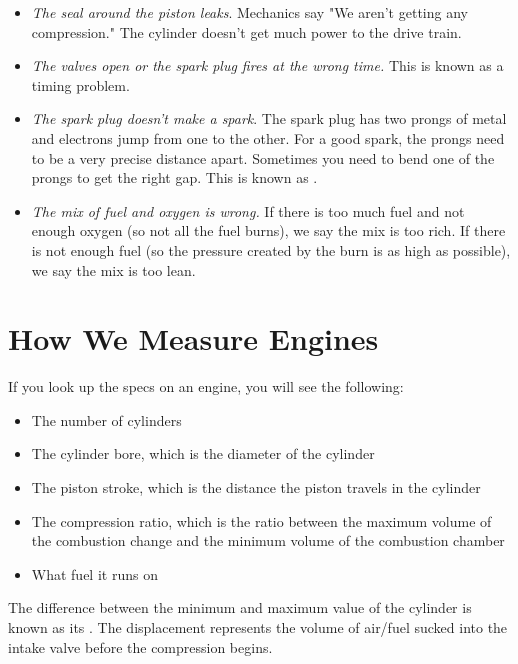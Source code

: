 \begin{itemize}

\item \textit{The seal around the piston leaks}.  Mechanics say "We aren't getting any compression."  The cylinder doesn't get much power to the drive train.

\item \textit{The valves open or the spark plug fires at the wrong time.}  This is known as a timing problem. 

\item \textit{The spark plug doesn't make a spark}. The spark plug has two prongs of metal and electrons jump from one to the other.  For a good spark,  the prongs need to be a very precise distance apart.  Sometimes you need to bend one of the prongs to get the right gap.  This is known as .

\item \textit{The mix of fuel and oxygen is wrong.}  If there is too much fuel and not enough oxygen (so not all the fuel burns),  we say the mix is too rich.  If there is not enough fuel (so the pressure created by the burn is as high as possible), we say the mix is too lean.

\end{itemize}

\section{How We Measure Engines}

If you look up the specs on an engine,  you will see the following:

\begin{itemize}
\item The number of cylinders
\item The cylinder bore, which is the diameter of the cylinder
\item The piston stroke,  which is the distance the piston travels in the cylinder
\item The compression ratio,  which is the ratio between the maximum volume of the combustion change and the minimum volume of the combustion chamber
\item What fuel it runs on
\end{itemize}

The difference between the minimum and maximum value of the cylinder is known as its . The displacement represents the volume of air/fuel sucked into the intake valve 
before the compression begins.

